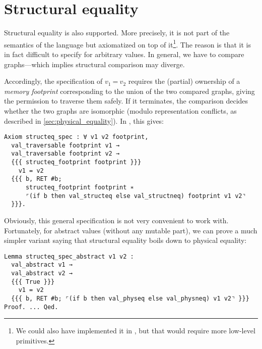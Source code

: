 \section{Structural equality}
\label{sec:structural_equality}

Structural equality is also supported.
More precisely, it is not part of the semantics of the language but axiomatized on top of it\footnote{We could also have implemented it in \ZooLang, but that would require more low-level primitives.}.
The reason is that it is in fact difficult to specify for arbitrary values.
In general, we have to compare graphs---which implies structural comparison may diverge.

Accordingly, the specification of $v_1\ \texttt{=}\ v_2$ requires the (partial) ownership of a \emph{memory footprint} corresponding to the union of the two compared graphs, giving the permission to traverse them safely.
If it terminates, the comparison decides whether the two graphs are isomorphic (modulo representation conflicts, as described in \cref{sec:physical_equality}).
In \Iris, this gives:

\begin{verbatim}
Axiom structeq_spec : ∀ v1 v2 footprint,
  val_traversable footprint v1 →
  val_traversable footprint v2 →
  {{{ structeq_footprint footprint }}}
    v1 = v2
  {{{ b, RET #b;
      structeq_footprint footprint ∗
      ⌜(if b then val_structeq else val_structneq) footprint v1 v2⌝
  }}}.
\end{verbatim}

Obviously, this general specification is not very convenient to work with.
Fortunately, for abstract values (without any mutable part), we can prove a much simpler variant saying that structural equality boils down to physical equality:

\begin{verbatim}
Lemma structeq_spec_abstract v1 v2 :
  val_abstract v1 →
  val_abstract v2 →
  {{{ True }}}
    v1 = v2
  {{{ b, RET #b; ⌜(if b then val_physeq else val_physneq) v1 v2⌝ }}}
Proof. ... Qed.
\end{verbatim}
